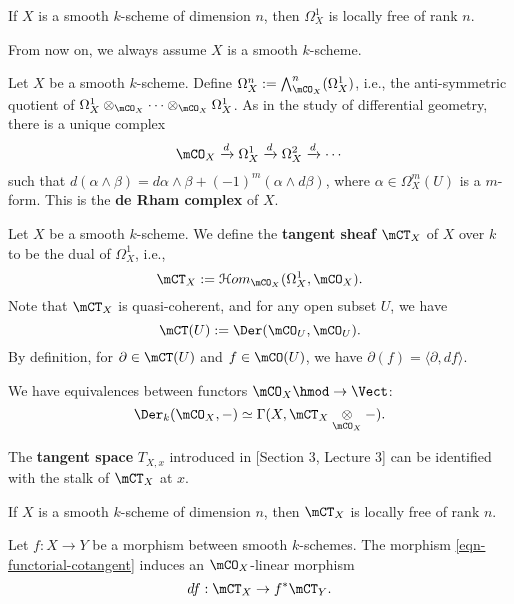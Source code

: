 	\begin{cor}
		If $X$ is a smooth $k$-scheme of dimension $n$, then $\Omega^1_{X}$ is locally free of rank $n$.
	\end{cor}

	From now on, we always assume $X$ is a smooth $k$-scheme.

	\begin{constr}
		Let $X$ be a smooth $k$-scheme. Define $\Omega_X^n:=\bigwedge_{\mCO_X}^n (\Omega_X^1)$, i.e., the anti-symmetric quotient of $\Omega_X^1 \ot_{\mCO_X} \cdots \ot_{\mCO_X} \Omega_X^1$. As in the study of differential geometry, there is a unique complex
		\[
			\mCO_X \xrightarrow{d} \Omega_X^1 \xrightarrow{d} \Omega_X^2 \xrightarrow{d} \cdots
		\]
		such that $d(\alpha\wedge \beta) = d\alpha\wedge \beta + (-1)^m (\alpha\wedge d\beta)$, where $\alpha\in \Omega_X^m(U)$ is a $m$-form. This is the \textbf{de Rham complex} of $X$.

	\end{constr}

	\begin{constr}
		Let $X$ be a smooth $k$-scheme. We define the \textbf{tangent sheaf} $\mCT_{X}$ of $X$ over $k$ to be the dual of $\Omega^1_{X}$, i.e., 
		\[
			\mCT_{X} := \mathcal{H}om_{\mCO_X}( \Omega^1_{X},\mCO_X ).
		\]
		Note that $\mCT_{X}$ is quasi-coherent, and for any open subset $U$, we have
		\[
			\mCT(U):= \Der( \mCO_U, \mCO_U).
		\]
		By definition, for $\partial\in \mCT(U)$ and $f\in \mCO(U)$, we have $\partial(f) = \langle \partial, df\rangle$.
	\end{constr}

	\begin{cor}
		\label{cor-der-tensor}
		We have equivalences between functors $\mCO_X\hmod \to \Vect$:
		\[
			\Der_k(\mCO_X,-) \simeq \Gamma(X, \mCT_X \ot_{\mCO_X} - ).
		\]
	\end{cor}

	\begin{rem}
		The \textbf{tangent space} $T_{X,x}$ introduced in [Section 3, Lecture 3] can be identified with the stalk of $\mCT_{X}$ at $x$.
	\end{rem}

	\begin{cor}
		If $X$ is a smooth $k$-scheme of dimension $n$, then $\mCT_{X}$ is locally free of rank $n$.
	\end{cor}

	

	\begin{constr}
		Let $f:X\to Y$ be a morphism between smooth $k$-schemes. The morphism \eqref{eqn-functorial-cotangent} induces an $\mCO_X$-linear morphism
		\[
			df: \mCT_{X}\to f^*\mCT_{Y}.
		\]

	\end{constr}

